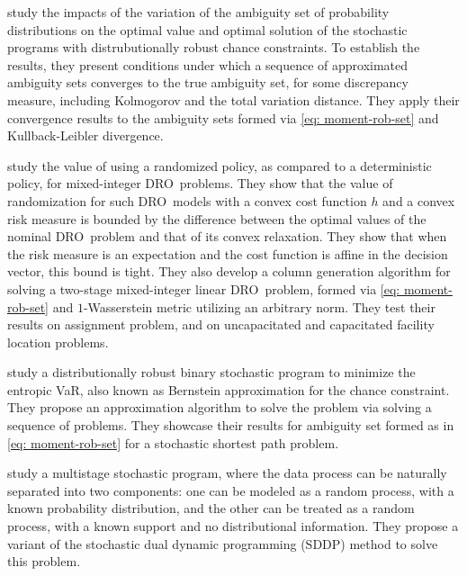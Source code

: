 \documentclass[final,onefignum,onetabnum]{class}
\newcommand{\dro}{DRO}
\begin{document}
\citet{guo2017convergence} study the impacts of the variation of the ambiguity set of probability distributions on the optimal value and  optimal solution of the stochastic programs with distrubutionally robust chance constraints. To establish the results, they present conditions under which a sequence of approximated ambiguity sets converges to the true ambiguity set, for some discrepancy measure, including Kolmogorov  and the total variation distance. They apply their convergence results to the ambiguity sets formed via \eqref{eq: moment-rob-set} and Kullback-Leibler divergence.

\citet{delage2018mip} study the value of using a randomized policy, as compared to a deterministic policy,  for mixed-integer \dro\ problems. They show that the value of randomization for such \dro\ models with a convex cost function $h$ and a convex risk measure
is bounded by the difference between the optimal values of the nominal \dro\ 
problem and that of its convex relaxation. They show that when the risk measure is an expectation and the cost function is affine in the decision vector, this bound
is tight. They also develop
a column generation algorithm  for solving a two-stage mixed-integer linear \dro\ problem, formed via  \eqref{eq: moment-rob-set} and
$1$-Wasserstein metric utilizing an arbitrary norm. They test their results on assignment problem, and on uncapacitated and capacitated facility location problems. 



\citet{long2014} study a distributionally robust binary stochastic program to minimize the entropic VaR, also known as Bernstein approximation
for the chance constraint. They propose an approximation algorithm to solve the problem via solving a sequence of problems. They showcase their results for ambiguity set formed as in \eqref{eq: moment-rob-set} for a stochastic shortest path problem. 




\citet{shapiro2013worst} study a  multistage stochastic program, where the data process can be naturally separated into two components: one can be modeled as a random process, with a known
probability distribution, and the other  can be treated as a random process, with a known support and no distributional information. They propose a variant of the stochastic dual dynamic programming (SDDP) method to solve this problem. 
\end{document}
